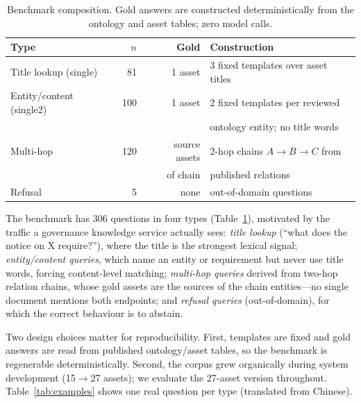 \documentclass[runningheads]{llncs}
\begin{document}
\begin{table}[t]
\caption{Benchmark composition. Gold answers are constructed
deterministically from the ontology and asset tables; zero model calls.}
\label{tab:bench}
\centering
\small
\begin{tabular}{lrrl}
\toprule
Type & $n$ & Gold & Construction \\
\midrule
Title lookup (single) & 81 & 1 asset & 3 fixed templates over asset titles \\
Entity/content (single2) & 100 & 1 asset & 2 fixed templates per reviewed \\
 & & & ontology entity; no title words \\
Multi-hop & 120 & source assets & 2-hop chains $A{\to}B{\to}C$ from \\
 & & of chain & published relations \\
Refusal & 5 & none & out-of-domain questions \\
\bottomrule
\end{tabular}
\end{table}

The benchmark has 306 questions in four types (Table~\ref{tab:bench}),
motivated by the traffic a governance knowledge service actually sees:
\emph{title lookup} (``what does the notice on X require?''), where the title
is the strongest lexical signal; \emph{entity/content queries}, which name an
entity or requirement but never use title words, forcing content-level
matching; \emph{multi-hop queries} derived from two-hop relation chains, whose
gold assets are the sources of the chain entities---no single document
mentions both endpoints; and \emph{refusal queries} (out-of-domain), for which
the correct behaviour is to abstain.

Two design choices matter for reproducibility. First, templates are fixed and
gold answers are read from published ontology/asset tables, so the benchmark
is regenerable deterministically. Second, the corpus grew organically during
system development (15$\to$27 assets); we evaluate the 27-asset version
throughout. Table~\ref{tab:examples} shows one real question per type
(translated from Chinese).
\end{document}
